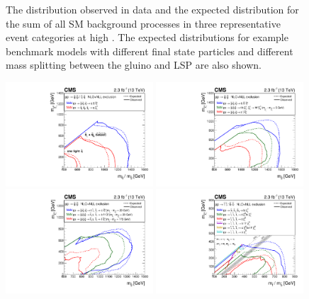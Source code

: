 \begin{figure}[tbhp]
\begin{center}
  \end{center}
  \caption{ The \mht distribution observed in data and the expected
    distribution for the sum of all SM background processes in three 
    representative event categories at high \scalht. The expected
    distributions for example benchmark models with different final state 
    particles and different mass splitting between the gluino and LSP 
    are also shown. \label{fig:mht-templates} }
\end{figure}
  
\begin{figure}[thp!]
  \begin{center}
    \includegraphics[width=0.49\textwidth]{figures/limits/v1/mixSUMMARY.pdf}
    \includegraphics[width=0.49\textwidth]{figures/limits/v1/gluinoSUMMARY.pdf} \\
    \includegraphics[width=0.49\textwidth]{figures/limits/v1/naturalSUMMARY.pdf}
    \includegraphics[width=0.49\textwidth]{figures/limits/v1/allThirdGenSUMMARY.pdf} \\

\end{center}
\end{figure}
